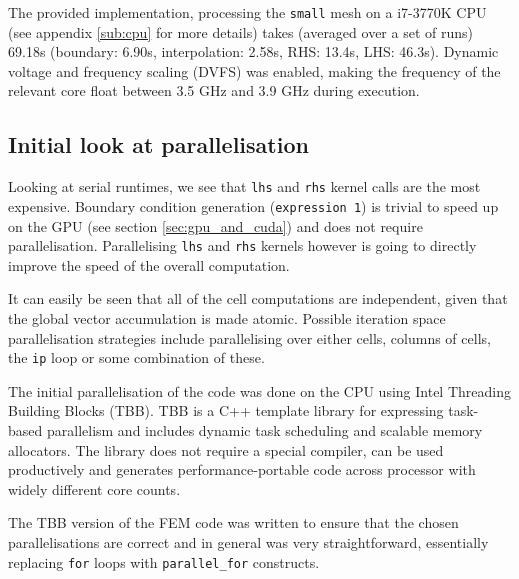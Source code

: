 \documentclass[11pt, oneside, a4paper]{article}
\begin{document}
The provided implementation, processing the \texttt{small} mesh on a i7-3770K CPU (see appendix \ref{sub:cpu} for more details) takes (averaged over a set of runs) 69.18s (boundary: 6.90s, interpolation: 2.58s, RHS: 13.4s, LHS: 46.3s). Dynamic voltage and frequency scaling (DVFS) was enabled, making the frequency of the relevant core float between 3.5 GHz and 3.9 GHz during execution.


\subsection{Initial look at parallelisation} %
\label{sub:initial_look_at_parallelisation}

Looking at serial runtimes, we see that \texttt{lhs} and \texttt{rhs} kernel calls are the most expensive. Boundary condition generation (\texttt{expression 1}) is trivial to speed up on the GPU (see section \ref{sec:gpu_and_cuda}) and does not require parallelisation. Parallelising \texttt{lhs} and \texttt{rhs} kernels however is going to directly improve the speed of the overall computation. 

It can easily be seen that all of the cell computations are independent, given that the global vector accumulation is made atomic. Possible iteration space parallelisation strategies include parallelising over either cells, columns of cells, the \texttt{ip} loop or some combination of these.

The initial parallelisation of the code was done on the CPU using Intel Threading Building Blocks (TBB)\cite{tbbr}. TBB is a C++ template library for expressing task-based parallelism and includes dynamic task scheduling and scalable memory allocators. The library does not require a special compiler, can be used productively and generates performance-portable code across processor with widely different core counts.

The TBB version of the FEM code was written to ensure that the chosen parallelisations are correct and in general was very straightforward, essentially replacing \texttt{for} loops with \texttt{parallel\_for} constructs.

\end{document}
